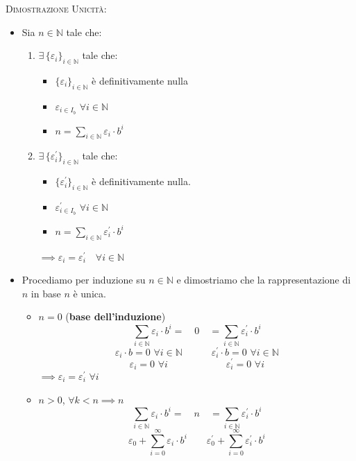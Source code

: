 \documentclass[10pt]{article}
\begin{document}
\textsc{Dimostrazione Unicità:}
\begin{itemize}
\item
Sia $n \in \mathbb{N}$ tale che:
\begin{enumerate}
\item
$\exists \, \{\varepsilon_i\}_{i \in \mathbb{N}}$ tale che:
\begin{itemize}
\item
$\{\varepsilon_i\}_{i \in \mathbb{N}}$ è definitivamente nulla
\item
$\varepsilon_{i \in I_b} \,\, \forall i \in \mathbb{N}$
\item
$n = \displaystyle{\sum_{i \in \mathbb{N}} \varepsilon_i \cdot b^i}$
\end{itemize}
\item
$\exists \, \{ \varepsilon^{'}_{i} \}_{i \in \mathbb{N}}$ tale che:
\begin{itemize}
\item
$\{\varepsilon^{'}_i \}_{i \in \mathbb{N}}$ è definitivamente nulla.
\item
$\varepsilon^{'}_{i \in I_b} \,\, \forall i \in \mathbb{N}$
\item
$n = \displaystyle{\sum_{i \in \mathbb{N}} \varepsilon^{'}_i \cdot b^i}$
\end{itemize}
$\implies \varepsilon_i = \varepsilon^{'}_i \quad \forall i \in \mathbb{N}$
\end{enumerate}
\item
Procediamo per induzione su $n \in \mathbb{N}$ e dimostriamo che la rappresentazione di $n$ in base $n$ è unica.
\begin{itemize}
\item
$n=0$ (\textbf{base dell'induzione})
$$ \sum_{i \in \mathbb{N}} \varepsilon_i \cdot b^i = \quad 0 \quad = \sum_{i \in \mathbb{N}} \varepsilon^{'}_i \cdot b^i $$
$$ \varepsilon_i \cdot b = 0 \,\, \forall i \in \mathbb{N} \quad \quad \quad \varepsilon^{'}_i \cdot b = 0 \,\, \forall i \in \mathbb{N} $$
$$\!\!\!\!\varepsilon_i = 0 \,\,\forall i \quad \quad \quad \quad \quad \quad \varepsilon^{'}_i = 0 \,\, \forall i$$ 
$\implies \varepsilon_i = \varepsilon^{'}_i \,\, \forall i$
\item
$n>0$, $\forall k < n \implies n$
$$ \sum_{i \in \mathbb{N}} \varepsilon_i \cdot b^i = \quad n \quad = \sum_{i \in \mathbb{N}} \varepsilon^{'}_i \cdot b^i $$
$$ \varepsilon_0 + \displaystyle{\sum_{i=0}^{\infty} \varepsilon_i \cdot b^i \quad \quad \varepsilon^{'}_0 + \sum_{i=0}^{\infty} \varepsilon^{'}_i \cdot b^i}$$

\end{itemize}
\end{itemize}
\end{document}
